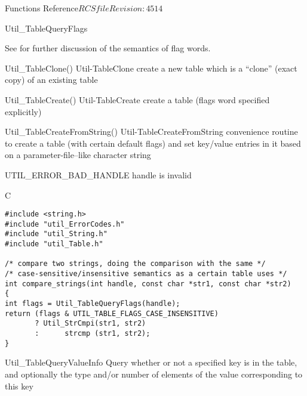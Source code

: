 \begin{cactuspart}{ Functions Reference}{$RCSfile$}{$Revision: 4514 $}
\begin{FunctionDescription}{Util\_TableQueryFlags}
\begin{Discussion}
See  for further discussion of the semantics
of flag words.
\end{Discussion}

\begin{SeeAlsoSection}
\begin{SeeAlso2} {Util\_TableClone()} {Util-TableClone}
create a new table which is a ``clone'' (exact copy) of an existing
table
\end{SeeAlso2}
\begin{SeeAlso2} {Util\_TableCreate()} {Util-TableCreate}
create a table (flags word specified explicitly)
\end{SeeAlso2}
\begin{SeeAlso2} {Util\_TableCreateFromString()} {Util-TableCreateFromString}
convenience routine to create a table (with certain default flags)
and set key/value entries in it based on a parameter-file--like
character string
\end{SeeAlso2}
\end{SeeAlsoSection}

\begin{ErrorSection}
\begin{Error}{UTIL\_ERROR\_BAD\_HANDLE}
handle is invalid
\end{Error}
\end{ErrorSection}

\begin{ExampleSection}
\begin{Example}{C}
\begin{verbatim}
#include <string.h>
#include "util_ErrorCodes.h"
#include "util_String.h"
#include "util_Table.h"

/* compare two strings, doing the comparison with the same */
/* case-sensitive/insensitive semantics as a certain table uses */
int compare_strings(int handle, const char *str1, const char *str2)
{
int flags = Util_TableQueryFlags(handle);
return (flags & UTIL_TABLE_FLAGS_CASE_INSENSITIVE)
       ? Util_StrCmpi(str1, str2)
       :      strcmp (str1, str2);
}
\end{verbatim}
\end{Example}
\end{ExampleSection}
\end{FunctionDescription}


\begin{FunctionDescription}{Util\_TableQueryValueInfo}
\label{Util-TableQueryValueInfo}
Query whether or not a specified key is in the table, and optionally
the type and/or number of elements of the value corresponding to this key


\end{FunctionDescription}
\end{cactuspart}
